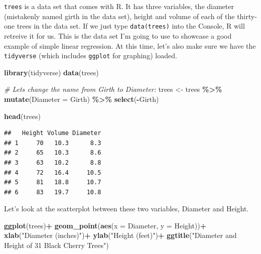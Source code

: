 \documentclass[
]{book}
\newenvironment{Shaded}{\begin{snugshade}}{\end{snugshade}}
\newcommand{\CommentTok}[1]{\textcolor[rgb]{0.56,0.35,0.01}{\textit{#1}}}
\newcommand{\DataTypeTok}[1]{\textcolor[rgb]{0.13,0.29,0.53}{#1}}
\newcommand{\KeywordTok}[1]{\textcolor[rgb]{0.13,0.29,0.53}{\textbf{#1}}}
\newcommand{\NormalTok}[1]{#1}
\newcommand{\OperatorTok}[1]{\textcolor[rgb]{0.81,0.36,0.00}{\textbf{#1}}}
\newcommand{\StringTok}[1]{\textcolor[rgb]{0.31,0.60,0.02}{#1}}
\begin{document}
\texttt{trees} is a data set that comes with R. It has three variables, the diameter (mistakenly named girth in the data set), height and volume of each of the thirty-one trees in the data set. If we just type \texttt{data(trees)} into the Console, R will retreive it for us. This is the data set I'm going to use to showcase a good example of simple linear regression. At this time, let's also make sure we have the \texttt{tidyverse} (which includes \texttt{ggplot} for graphing) loaded.

\begin{Shaded}
\begin{Highlighting}[]
\KeywordTok{library}\NormalTok{(tidyverse)}
\KeywordTok{data}\NormalTok{(trees)}

\CommentTok{\# Let\textquotesingle{}s change the name from Girth to Diameter:}
\NormalTok{trees \textless{}{-}}\StringTok{ }\NormalTok{trees }\OperatorTok{\%\textgreater{}\%}
\StringTok{  }\KeywordTok{mutate}\NormalTok{(}\DataTypeTok{Diameter =}\NormalTok{ Girth) }\OperatorTok{\%\textgreater{}\%}
\StringTok{  }\KeywordTok{select}\NormalTok{(}\OperatorTok{{-}}\NormalTok{Girth)}

\KeywordTok{head}\NormalTok{(trees)}
\end{Highlighting}
\end{Shaded}

\begin{verbatim}
##   Height Volume Diameter
## 1     70   10.3      8.3
## 2     65   10.3      8.6
## 3     63   10.2      8.8
## 4     72   16.4     10.5
## 5     81   18.8     10.7
## 6     83   19.7     10.8
\end{verbatim}

Let's look at the scatterplot between these two variables, Diameter and Height.

\begin{Shaded}
\begin{Highlighting}[]
\KeywordTok{ggplot}\NormalTok{(trees)}\OperatorTok{+}
\StringTok{  }\KeywordTok{geom\_point}\NormalTok{(}\KeywordTok{aes}\NormalTok{(}\DataTypeTok{x =}\NormalTok{ Diameter, }\DataTypeTok{y =}\NormalTok{  Height))}\OperatorTok{+}
\StringTok{  }\KeywordTok{xlab}\NormalTok{(}\StringTok{"Diameter (inches)"}\NormalTok{)}\OperatorTok{+}
\StringTok{  }\KeywordTok{ylab}\NormalTok{(}\StringTok{"Height (feet)"}\NormalTok{)}\OperatorTok{+}
\StringTok{  }\KeywordTok{ggtitle}\NormalTok{(}\StringTok{"Diameter and Height of 31 Black Cherry Trees"}\NormalTok{)}
\end{Highlighting}
\end{Shaded}
\end{document}
